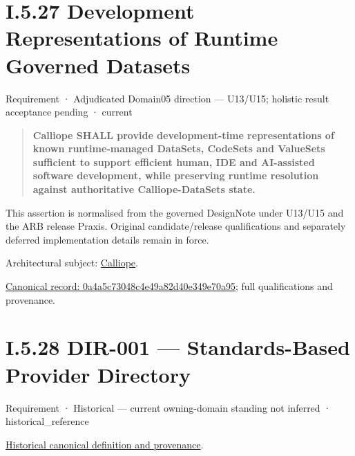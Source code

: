 \section*{I.5.27 Development Representations of Runtime Governed Datasets}
\label{navigation:I.5.27}

\label{element:0a4a5c73048c4e49a82d40e349e70a95}
{\small Requirement · Adjudicated Domain05 direction — U13/U15; holistic result acceptance pending · current}\par

\begin{quote}


\textbf{Calliope SHALL provide development-time representations of known
runtime-managed DataSets, CodeSets and ValueSets sufficient to support
efficient human, IDE and AI-assisted software development, while
preserving runtime resolution against authoritative Calliope-DataSets
state.}



\end{quote}


This assertion is normalised from the governed DesignNote under U13/U15 and the ARB release Praxis. Original candidate/release qualifications and separately deferred implementation details remain in force.



Architectural subject: \hyperref[element:466ad8f75a954c0581b5bba090443849]{Calliope}.


{\footnotesize \href{../../../../continuum/motivation/requirement/0a4a5c73048c4e49a82d40e349e70a95.md}{Canonical record: 0a4a5c73048c4e49a82d40e349e70a95}; full qualifications and provenance.}\par
\section*{I.5.28 DIR-001 — Standards-Based Provider Directory}
\label{navigation:I.5.28}

\label{element:c1b1d82f8a9b4c649a3216c5e09a22c6}
{\small Requirement · Historical — current owning-domain standing not inferred · historical\_reference}\par
\href{../../../../continuum/motivation/requirement/c1b1d82f8a9b4c649a3216c5e09a22c6.md}{Historical canonical definition and provenance}.\par

